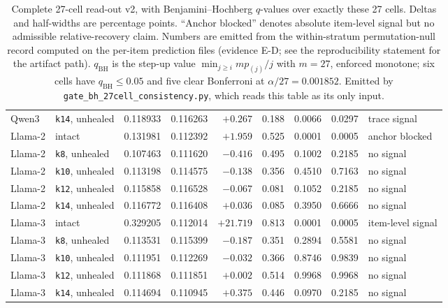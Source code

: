 \begin{table}[t]
\begin{tabular}{llrrrrrrl}
Qwen3 & \texttt{k14}, unhealed & 0.118933 & 0.116263 & $+0.267$ & 0.188 & 0.0066 & 0.0297 & trace signal \\
Llama-2 & intact & 0.131981 & 0.112392 & $+1.959$ & 0.525 & 0.0001 & 0.0005 & anchor blocked \\
Llama-2 & \texttt{k8}, unhealed & 0.107463 & 0.111620 & $-0.416$ & 0.495 & 0.1002 & 0.2185 & no signal \\
Llama-2 & \texttt{k10}, unhealed & 0.113198 & 0.114575 & $-0.138$ & 0.356 & 0.4510 & 0.7163 & no signal \\
Llama-2 & \texttt{k12}, unhealed & 0.115858 & 0.116528 & $-0.067$ & 0.081 & 0.1052 & 0.2185 & no signal \\
Llama-2 & \texttt{k14}, unhealed & 0.116772 & 0.116408 & $+0.036$ & 0.085 & 0.3950 & 0.6666 & no signal \\
Llama-3 & intact & 0.329205 & 0.112014 & $+21.719$ & 0.813 & 0.0001 & 0.0005 & item-level signal \\
Llama-3 & \texttt{k8}, unhealed & 0.113531 & 0.115399 & $-0.187$ & 0.351 & 0.2894 & 0.5581 & no signal \\
Llama-3 & \texttt{k10}, unhealed & 0.111951 & 0.112269 & $-0.032$ & 0.366 & 0.8746 & 0.9839 & no signal \\
Llama-3 & \texttt{k12}, unhealed & 0.111868 & 0.111851 & $+0.002$ & 0.514 & 0.9968 & 0.9968 & no signal \\
Llama-3 & \texttt{k14}, unhealed & 0.114694 & 0.110945 & $+0.375$ & 0.446 & 0.0970 & 0.2185 & no signal \\
\bottomrule
\end{tabular}
\caption{Complete 27-cell read-out v2, with Benjamini--Hochberg $q$-values over exactly these 27 cells. Deltas and half-widths are percentage points. ``Anchor blocked'' denotes absolute item-level signal but no admissible relative-recovery claim. Numbers are emitted from the within-stratum permutation-null record computed on the per-item prediction files (evidence \textsf{E-D}; see the reproducibility statement for the artifact path). $q_{\mathrm{BH}}$ is the step-up value $\min_{j\geq i} m p_{(j)}/j$ with $m=27$, enforced monotone; six cells have $q_{\mathrm{BH}}\leq0.05$ and five clear Bonferroni at $\alpha/27=0.001852$. Emitted by \texttt{gate\_bh\_27cell\_consistency.py}, which reads this table as its only input.}
\label{tab:v2-full}
\end{table}
